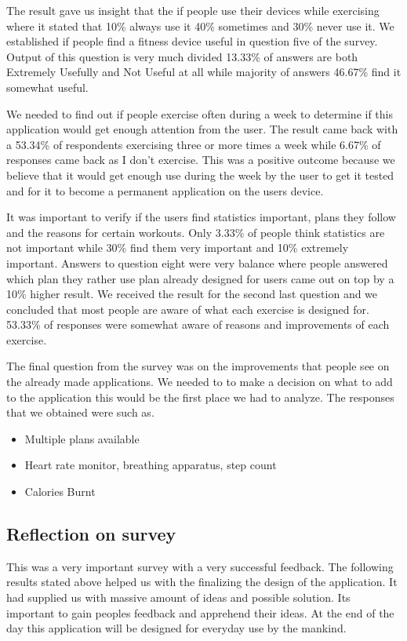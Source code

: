 \documentclass[a4paper,12pt,twoside]{report}
\begin{document}
The result gave us insight that the if people use their devices while exercising where it stated that 10\% always use it 40\% sometimes and 30\% never use it.
We established if people find a fitness device useful in question five of the survey. Output of this question is very much divided 13.33\% of answers are both Extremely Usefully and Not Useful at all while majority of answers 46.67\% find it somewhat useful.

We needed to find out if people exercise often during a week to determine if this application would get enough attention from the user.
The result came back with a 53.34\% of respondents exercising three or more times a week while 6.67\% of responses came back as I don't exercise. 
This was a positive outcome because we believe that it would get enough use during the week by the user to get it tested and for it to become a permanent application on the users device.

It was important to verify if the users find statistics important, plans they follow and the reasons for certain workouts.
Only 3.33\% of people think statistics are not important while 30\% find them very important and 10\% extremely important.
Answers to question eight were very balance where people answered which plan they rather use plan already designed for users came out on top by a 10\% higher result.
We received the result for the second last question and we concluded that most people are aware of what each exercise is designed for. 53.33\% of responses were somewhat aware of reasons and improvements of each exercise.

The final question from the survey was on the improvements that people see on the already made applications.
We needed to to make a decision on what to add to the application this would be the first place we had to analyze.
The responses that we obtained were such as.
\begin{itemize}
    \item  Multiple plans available
    \item Heart rate monitor, breathing apparatus, step count
    \item Calories Burnt 
\end{itemize}
   
\subsection{Reflection on survey} 
This was a very important survey with a very successful feedback. The following results stated above helped us with the finalizing the design of the application.
It had supplied us with massive amount of ideas and possible solution. Its important to gain peoples feedback and apprehend their ideas. At the end of the day this application will be designed for everyday use by the mankind.\\
\end{document}
